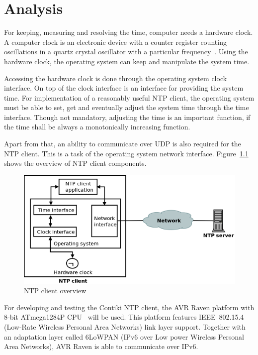 
\chapter{Analysis}
For keeping, measuring and resolving the time, computer needs a hardware clock.
A computer clock is an electronic device with a counter register counting oscillations in a
quartz crystal oscillator with a particular frequency~\cite{thesis-sync}.
Using the hardware clock, the operating system can keep and manipulate the system time.

Accessing the hardware clock is done through the operating system clock interface.
On top of the clock interface is an interface for providing the system time.
For implementation of a reasonably useful NTP client,
the operating system must be able to set, get and eventually adjust the system time
through the time interface.
Though not mandatory, adjusting the time is an important function,
if the time shall be always a monotonically increasing function.

Apart from that, an ability to communicate over UDP is also required for the NTP client.
This is a task of the operating system network interface.
Figure~\ref{fig:analysis-overview} shows the overview of NTP client components.

\begin{figure}
  \centering
  \includegraphics[width=13cm,keepaspectratio]{fig/analysis.png}
  \caption{NTP client overview} %
  \label{fig:analysis-overview} %
\end{figure}

For developing and testing the Contiki NTP client,
the AVR Raven platform with 8-bit ATmega1284P CPU~\cite{avr-datasheet} will be used.
This platform features IEEE~802.15.4 (Low-Rate Wireless Personal Area Networks) link layer support.
Together with an adaptation layer called 6LoWPAN (IPv6 over Low power Wireless Personal Area Networks),
AVR Raven is able to communicate over IPv6.









